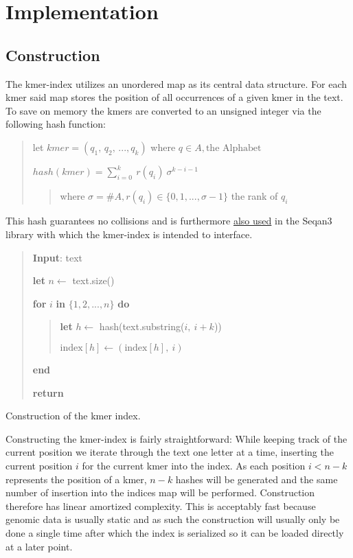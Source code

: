 \chapter{Implementation}

\section{Construction}
The kmer-index utilizes an unordered map as its central data structure.
For each kmer said map stores the position of all occurrences of a given kmer in the text.
To save on memory the kmers are converted to an unsigned integer via
the following hash function:
\begin{verse}
let $kmer =(q_{1},\,q_{2},\,...,q_{k})$ where $q\in A, \text{the Alphabet}$

$hash(kmer) = \sum_{i=0}^{k}\:r(q_{i})\:\sigma^{k-i-1}$
\begin{verse}
where $\sigma=\#A,r(q_{i})\in\{0,1,...,\sigma-1\}$ the rank of $q_{i}$
\end{verse}
\end{verse}
This hash guarantees no collisions and is furthermore
\href{http://docs.seqan.de/seqan/3-master-user/group__views.html\#ga6e598d6a021868f704d39df73252974f}{also used} in the Seqan3
library with which the kmer-index is intended to interface.

\begin{algorithm}[H]
\begin{verse}
\textbf{Input}: text

\textbf{let} $n\leftarrow$ text.size()

\textbf{for} $i$ \textbf{in} $\{1,2,...,n\}$ \textbf{do}
\begin{verse}
\textbf{let} $h\leftarrow$ hash(text.substring($i,\:i+k$))

$\text{index}[h]\leftarrow(\text{index}[h],\:i)$
\end{verse}

\textbf{end}

\textbf{return}
\end{verse}
\caption{Construction of the kmer index.}
\end{algorithm}

Constructing the kmer-index is fairly straightforward: While keeping track of the current position we iterate through the
text one letter at a time, inserting the current position $i$ for the current kmer into the index.
As each position $i<n-k$ represents the position of a kmer, $n-k$ hashes will be generated and the same number of insertion
into the indices map will be performed. Construction therefore has linear amortized complexity. This is acceptably fast because genomic data is
usually static and as such the construction will usually only be done a single time after which the index is serialized
so it can be loaded directly at a later point.
\newpage
